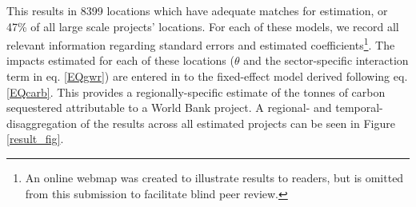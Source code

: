 \documentclass{article}\usepackage[]{graphicx}\usepackage[]{color}
\newenvironment{knitrout}{}{}  %
\begin{document}
\begin{knitrout}
This results in 8399 locations which have adequate matches for estimation, or 47\% of all large scale projects' locations. 
For each of these models, we record all relevant information regarding standard errors and estimated coefficients\footnote{An online webmap was created to illustrate results to readers, but is omitted from this submission to facilitate blind peer review.}.  
The impacts estimated for each of these locations (\begin{math}\theta\end{math} and the sector-specific interaction term in eq. \ref{EQgwr}) are entered in to the fixed-effect model derived following eq. \ref{EQcarb}.
This provides a regionally-specific estimate of the tonnes of carbon sequestered attributable to a World Bank project.
A regional- and temporal- disaggregation of the results across all estimated projects can be seen in Figure \ref{result_fig}.

\newpage

\end{knitrout}
\end{document}
